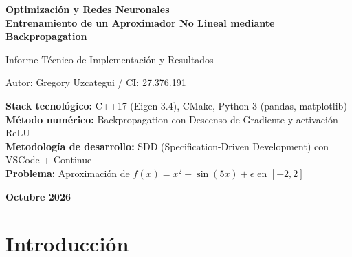 \documentclass[12pt,a4paper]{article}
\theoremstyle{definition}
\begin{document}
\begin{titlepage}
    \centering
    \vspace*{2cm}
    {\Huge\bfseries Optimizaci\'{o}n y Redes Neuronales\\[0.3cm] Entrenamiento de un Aproximador No Lineal mediante Backpropagation\par}
    \vspace{1.5cm}
    {\Large Informe T\'{e}cnico de Implementaci\'{o}n y Resultados\par}
    \vspace{2cm}
    {\Large Autor: Gregory Uzcategui / CI: 27.376.191 \par}
    \vspace{2cm}
    {\large
    \textbf{Stack tecnol\'{o}gico:} C++17 (Eigen 3.4), CMake, Python 3 (pandas, matplotlib)\\[0.5cm]
    \textbf{M\'{e}todo num\'{e}rico:} Backpropagation con Descenso de Gradiente y activaci\'{o}n ReLU\\[0.5cm]
    \textbf{Metodolog\'{i}a de desarrollo:} SDD (Specification-Driven Development) con VSCode + Continue\\[0.5cm]
    \textbf{Problema:} Aproximaci\'{o}n de $f(x) = x^2 + \sin(5x) + \epsilon$ en $[-2, 2]$
    \par}
    \vfill
    {\large \textbf{Octubre 2026}}
\end{titlepage} 

\begin{abstract}
\noindent
La implementaci\'{o}n de una red neuronal de una capa oculta con activaci\'{o}n ReLU para aproximar la funci\'{o}n no lineal $f(x) = x^2 + \sin(5x) + \epsilon$ en el dominio $x \in [-2, 2]$. Se desarroll\'{o} el algoritmo de \textbf{Backpropagation} desde cero en C++17 con Eigen, calculando manualmente los gradientes de la funci\'{o}n de costo MSE respecto a cada peso y sesgo mediante la Regla de la Cadena. Se evaluaron tres tasas de aprendizaje ($\alpha \in \{0.001, 0.01, 0.5\}$) con cinco semillas aleatorias distintas, evidenciando la presencia de \textbf{m\'{i}nimos locales} en el paisaje de optimizaci\'{o}n no convexo. 
\end{abstract}

\tableofcontents
\newpage

\section{Introducci\'{o}n}\label{sec:intro}
\end{document}
